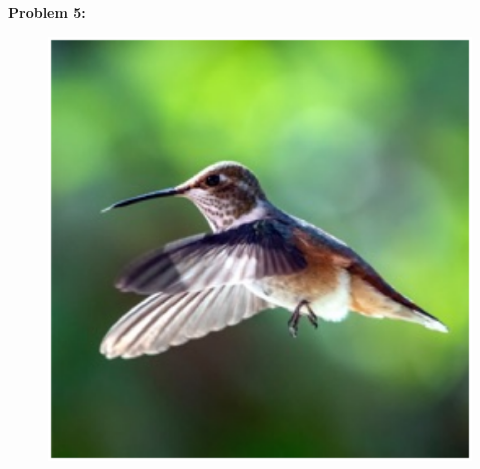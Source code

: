 \documentclass[11pt]{article}
\newenvironment{problem}[1]{\textbf{Problem #1: }}{\newpage}
\begin{document}
\begin{problem}{5}
		\begin{figure}
			\centering
			\includegraphics{Matlab/Bird2}
		\end{figure}
		
		
		
	\end{problem}
\end{document}
